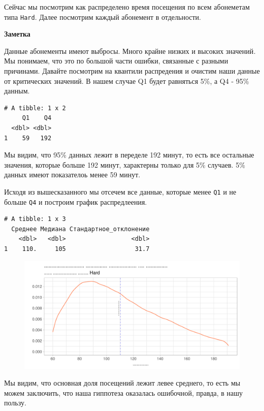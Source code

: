 \documentclass[
  letterpaper,
  DIV=11,
  numbers=noendperiod]{scrartcl}
\begin{document}
Сейчас мы посмотрим как распределено время посещения по всем абонеметам
типа \texttt{Hard}. Далее посмотрим каждый абонемент в отдельности.

\begin{tcolorbox}[enhanced jigsaw, colframe=quarto-callout-note-color-frame, leftrule=.75mm, rightrule=.15mm, toprule=.15mm, left=2mm, arc=.35mm, bottomrule=.15mm, colback=white, breakable, opacityback=0]
\begin{minipage}[t]{5.5mm}
\textcolor{quarto-callout-note-color}{\faInfo}
\end{minipage}%
\begin{minipage}[t]{\textwidth - 5.5mm}

\textbf{Заметка}\vspace{2mm}

Данные абонементы имеют выбросы. Много крайне низких и высоких
значений\emph{.} Мы понимаем, что это по большой части ошибки, связанные
с разными причинами. Давайте посмотрим на квантили распредения и очистим
наши данные от критических значений. В нашем случае Q1 будет равняться
5\%, а Q4 - 95\% данным.

\end{minipage}%
\end{tcolorbox}

\begin{verbatim}
# A tibble: 1 x 2
     Q1    Q4
  <dbl> <dbl>
1    59   192
\end{verbatim}

Мы видим, что 95\% данных лежит в переделе 192 минут, то есть все
остальные значения, которые больше 192 минут, характерны только для 5\%
случаев. 5\% данных имеют показателоь менее 59 минут.

Исходя из вышесказанного мы отсечем все данные, которые менее
\texttt{Q1} и не больше \texttt{Q4} и построим график распредлеения.

\begin{verbatim}
# A tibble: 1 x 3
  Среднее Медиана Стандартное_отклонение
    <dbl>   <dbl>                  <dbl>
1    110.     105                   31.7
\end{verbatim}

\begin{figure}

{\centering \includegraphics{./intro_files/figure-pdf/unnamed-chunk-32-1.pdf}

}

\end{figure}

Мы видим, что основная доля посещений лежит левее среднего, то есть мы
можем заключить, что наша гиппотеза оказалась ошибочной, правда, в нашу
пользу.
\end{document}
